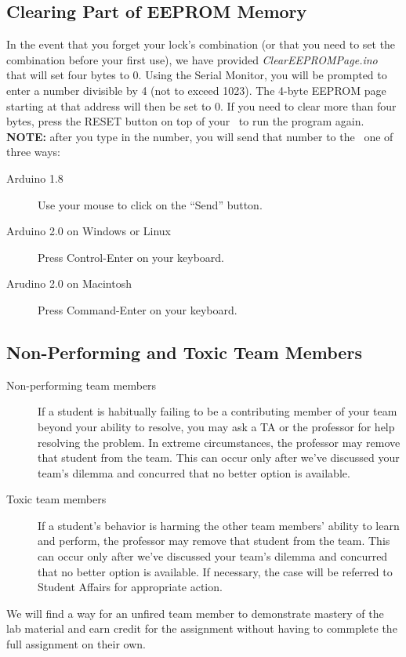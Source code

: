 \subsection*{Clearing Part of EEPROM Memory}

In the event that you forget your lock's combination (or that you need to set
the combination before your first use), we have provided
\textit{ClearEEPROMPage.ino} that will set four bytes to 0. Using the Serial
Monitor, you will be prompted to enter a number divisible by 4 (not to exceed
1023). The 4-byte EEPROM page starting at that address will then be set to 0.
If you need to clear more than four bytes, press the RESET button on top of your
\nano\ to run the program again.
\textbf{NOTE:} after you type in the number, you will send that number to the
\nano\ one of three ways:
\begin{description}
\item [Arduino 1.8] Use your mouse to click on the ``Send'' button.
\item [Arduino 2.0 on Windows or Linux] Press Control-Enter on your keyboard.
\item [Arudino 2.0 on Macintosh] Press Command-Enter on your keyboard.
\end{description}

\subsection*{Non-Performing and Toxic Team Members}

\begin{description}
\item[Non-performing team members] If a student is habitually failing to be a
contributing member of your team beyond your ability to resolve, you may
ask a TA or the professor for help resolving the problem.  In extreme
circumstances, the professor may remove that student from the team.  This
can occur only after we've discussed your team's dilemma and concurred
that no better option is available.
\item [Toxic team members] If a student's behavior is harming the other team
members' ability to learn and perform, the professor may remove that
student from the team.  This can occur only after we've discussed your
team's dilemma and concurred that no better option is available. If necessary,
the case will be referred to Student Affairs for appropriate action.
\end{description}

We will find a way for an unfired team member to demonstrate mastery of the
lab material and earn credit for the assignment without having to commplete the
full assignment on their own.

